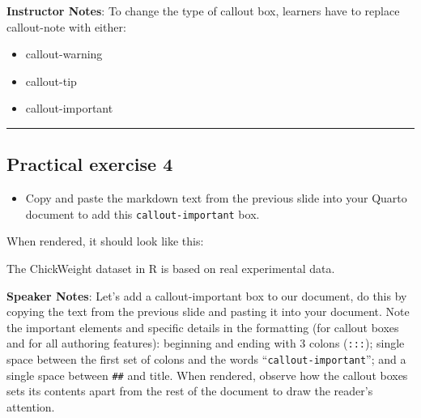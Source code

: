 \documentclass[
  letterpaper,
  DIV=11,
  numbers=noendperiod]{scrartcl}
\providecommand{\tightlist}{%
  \setlength{\itemsep}{0pt}\setlength{\parskip}{0pt}}
\begin{document}
\textbf{Instructor Notes}: To change the type of callout box, learners
have to replace callout-note with either:

\begin{itemize}
\item
  callout-warning
\item
  callout-tip
\item
  callout-important
\end{itemize}

\begin{center}\rule{0.5\linewidth}{0.5pt}\end{center}

\subsection{Practical exercise 4}\label{practical-exercise-4}

\begin{itemize}
\tightlist
\item[$\square$]
  Copy and paste the markdown text from the previous slide into your
  Quarto document to add this \texttt{callout-important} box.
\end{itemize}

When rendered, it should look like this:

\begin{tcolorbox}[enhanced jigsaw, opacitybacktitle=0.6, toptitle=1mm, colbacktitle=quarto-callout-important-color!10!white, toprule=.15mm, left=2mm, colback=white, colframe=quarto-callout-important-color-frame, opacityback=0, bottomtitle=1mm, breakable, titlerule=0mm, rightrule=.15mm, arc=.35mm, title=\textcolor{quarto-callout-important-color}{\faExclamation}\hspace{0.5em}{Based on Real Data}, bottomrule=.15mm, coltitle=black, leftrule=.75mm]

The ChickWeight dataset in R is based on real experimental data.

\end{tcolorbox}

\textbf{Speaker Notes}: Let's add a callout-important box to our
document, do this by copying the text from the previous slide and
pasting it into your document. Note the important elements and specific
details in the formatting (for callout boxes and for all authoring
features): beginning and ending with 3 colons (\texttt{:::}); single
space between the first set of colons and the words
``\texttt{callout-important}''; and a single space between \texttt{\#\#}
and title. When rendered, observe how the callout boxes sets its
contents apart from the rest of the document to draw the reader's
attention.
\end{document}
